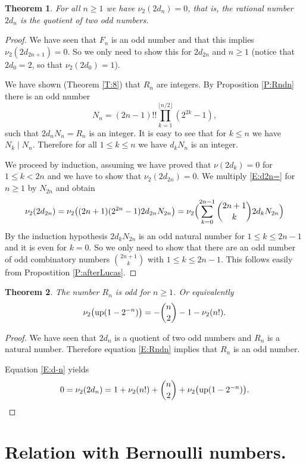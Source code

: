 \documentclass[10pt]{amsart}
\newtheorem{thm}{Theorem}
\theoremstyle{definition}
\theoremstyle{remark}
\begin{document}
\begin{thm}
For all $n\ge1$ we have $\nu_2(2d_n)=0$, that is, the rational number $2d_n$ is the
quotient of two odd numbers.
\end{thm}

\begin{proof}
We have seen that $F_n$ is an odd number and that this implies $\nu_2(2d_{2n+1})=0$.
So we only need to show this for $2d_{2n}$ and $n\ge1$ (notice that $2d_0=2$, so that
$\nu_2(2d_0)=1$).

We have shown (Theorem \ref{T:8}) that $R_n$ are integers. By Proposition \ref{P:Rndn}
there is an odd number
\[N_n=(2n-1)!!\prod_{k=1}^{\lfloor n/2\rfloor}(2^{2k}-1),\]
such that $2d_n N_n=R_n$ is an integer. It is easy to see that for $k\le n$
we have $N_k\mid N_n$.  Therefore for all $1\le k\le n$ we have $d_kN_n$
is an integer.

We proceed by induction, assuming we have proved that $\nu(2d_k)=0$ for $1\le k<2n$
and we have to show that $\nu_2(2d_{2n})=0$.
We multiply \eqref{E:d2n=} for $n\ge1$  by $N_{2n}$
and obtain
\[\nu_2(2d_{2n})=\nu_2\bigl((2n+1)(2^{2n}-1)2d_{2n}N_{2n}\bigr)
=\nu_2\Bigl(\sum_{k=0}^{2n-1}\binom{2n+1}{k}2d_kN_{2n}\Bigr)\]
By the induction hypothesis $2d_kN_{2n}$ is an odd natural number for $1\le k\le 2n-1$
and it is even for $k=0$. So we only need to show that there are an odd number of
odd combinatory numbers $\binom{2n+1}{k}$ with $1\le k\le 2n-1$. This follows easily
from Propostition \ref{P:afterLucas}.
\end{proof}

\begin{thm}
The number $R_n$ is odd for $n\ge1$. Or equivalently
\begin{equation}
\nu_2\bigl(\operatorname{up}(1-2^{-n})\bigr)=-\binom{n}{2}-1-\nu_2(n!).
\end{equation}
\end{thm}
\begin{proof}
We have seen that $2d_n$ is a quotient of two odd numbers and $R_n$ is a
natural number.   Therefore equation \eqref{E:Rndn} implies
that $R_n$ is an odd number.

Equation \eqref{E:d-n} yields
\[0=\nu_2(2d_n)=1+\nu_2(n!)+\binom{n}{2}+\nu_2\bigl(\operatorname{up}(1-2^{-n})\bigr).\]
\end{proof}



\section{Relation with Bernoulli numbers.}
\end{document}
